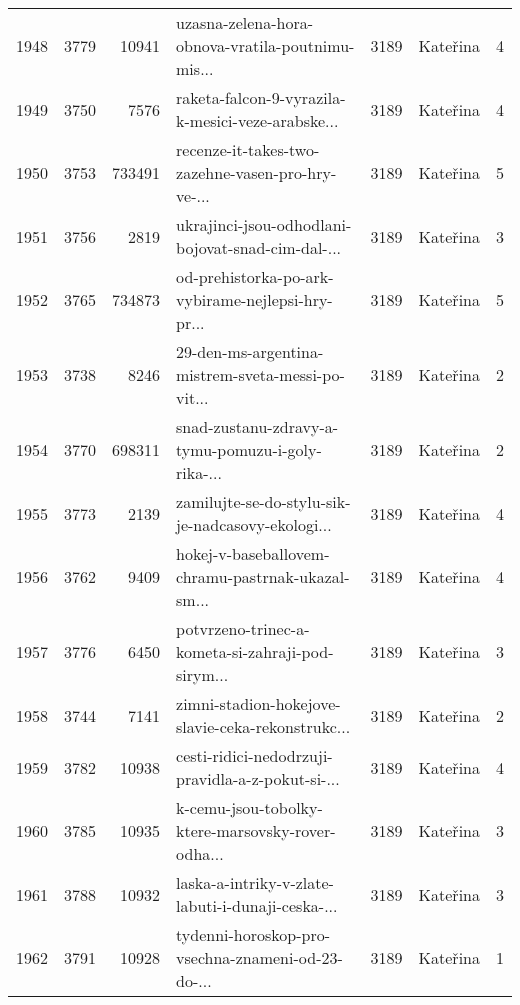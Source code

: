 \begin{tabular}{lrrlrlr}
1948 &       3779 &    10941 &  uzasna-zelena-hora-obnova-vratila-poutnimu-mis... &     3189 &                     Kateřina &               4 \\
1949 &       3750 &     7576 &  raketa-falcon-9-vyrazila-k-mesici-veze-arabske... &     3189 &                     Kateřina &               4 \\
1950 &       3753 &   733491 &  recenze-it-takes-two-zazehne-vasen-pro-hry-ve-... &     3189 &                     Kateřina &               5 \\
1951 &       3756 &     2819 &  ukrajinci-jsou-odhodlani-bojovat-snad-cim-dal-... &     3189 &                     Kateřina &               3 \\
1952 &       3765 &   734873 &  od-prehistorka-po-ark-vybirame-nejlepsi-hry-pr... &     3189 &                     Kateřina &               5 \\
1953 &       3738 &     8246 &  29-den-ms-argentina-mistrem-sveta-messi-po-vit... &     3189 &                     Kateřina &               2 \\
1954 &       3770 &   698311 &  snad-zustanu-zdravy-a-tymu-pomuzu-i-goly-rika-... &     3189 &                     Kateřina &               2 \\
1955 &       3773 &     2139 &  zamilujte-se-do-stylu-sik-je-nadcasovy-ekologi... &     3189 &                     Kateřina &               4 \\
1956 &       3762 &     9409 &  hokej-v-baseballovem-chramu-pastrnak-ukazal-sm... &     3189 &                     Kateřina &               4 \\
1957 &       3776 &     6450 &  potvrzeno-trinec-a-kometa-si-zahraji-pod-sirym... &     3189 &                     Kateřina &               3 \\
1958 &       3744 &     7141 &  zimni-stadion-hokejove-slavie-ceka-rekonstrukc... &     3189 &                     Kateřina &               2 \\
1959 &       3782 &    10938 &  cesti-ridici-nedodrzuji-pravidla-a-z-pokut-si-... &     3189 &                     Kateřina &               4 \\
1960 &       3785 &    10935 &  k-cemu-jsou-tobolky-ktere-marsovsky-rover-odha... &     3189 &                     Kateřina &               3 \\
1961 &       3788 &    10932 &  laska-a-intriky-v-zlate-labuti-i-dunaji-ceska-... &     3189 &                     Kateřina &               3 \\
1962 &       3791 &    10928 &  tydenni-horoskop-pro-vsechna-znameni-od-23-do-... &     3189 &                     Kateřina &               1 \\

\end{tabular}
